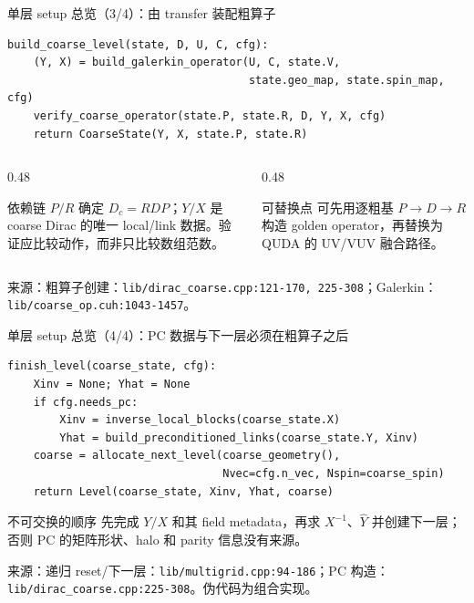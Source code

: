 \documentclass[UTF8,aspectratio=169,11pt]{ctexbeamer}
\newcommand{\source}[1]{\vspace{0.05em}\par{\raggedright\scriptsize\color{muted}来源：#1\par}}
\newcommand{\codepath}[1]{\nolinkurl{#1}}
\begin{document}
\begin{frame}[fragile,t]{单层 setup 总览（3/4）：由 transfer 装配粗算子}
  \small
  \begin{lstlisting}[firstnumber=1]
build_coarse_level(state, D, U, C, cfg):
    (Y, X) = build_galerkin_operator(U, C, state.V,
                                     state.geo_map, state.spin_map, cfg)
    verify_coarse_operator(state.P, state.R, D, Y, X, cfg)
    return CoarseState(Y, X, state.P, state.R)
  \end{lstlisting}
  \begin{columns}[T,totalwidth=\textwidth]
    \begin{column}{0.48\textwidth}
      \begin{block}{依赖链}
        \(P/R\) 确定 \(D_c=RDP\)；\(Y/X\) 是 coarse Dirac 的唯一 local/link 数据。验证应比较动作，而非只比较数组范数。
      \end{block}
    \end{column}
    \begin{column}{0.48\textwidth}
      \begin{alertblock}{可替换点}
        可先用逐粗基 \(P\to D\to R\) 构造 golden operator，再替换为 QUDA 的 UV/VUV 融合路径。
      \end{alertblock}
    \end{column}
  \end{columns}
  \source{粗算子创建：\codepath{lib/dirac_coarse.cpp:121-170, 225-308}；Galerkin：\codepath{lib/coarse_op.cuh:1043-1457}。}
\end{frame}

\begin{frame}[fragile,t]{单层 setup 总览（4/4）：PC 数据与下一层必须在粗算子之后}
  \small
  \begin{lstlisting}[firstnumber=1]
finish_level(coarse_state, cfg):
    Xinv = None; Yhat = None
    if cfg.needs_pc:
        Xinv = inverse_local_blocks(coarse_state.X)
        Yhat = build_preconditioned_links(coarse_state.Y, Xinv)
    coarse = allocate_next_level(coarse_geometry(),
                                 Nvec=cfg.n_vec, Nspin=coarse_spin)
    return Level(coarse_state, Xinv, Yhat, coarse)
  \end{lstlisting}
  \begin{alertblock}{不可交换的顺序}
    先完成 \(Y/X\) 和其 field metadata，再求 \(X^{-1}\)、\(\widehat Y\) 并创建下一层；否则 PC 的矩阵形状、halo 和 parity 信息没有来源。
  \end{alertblock}
  \source{递归 reset/下一层：\codepath{lib/multigrid.cpp:94-186}；PC 构造：\codepath{lib/dirac_coarse.cpp:225-308}。伪代码为组合实现。}
\end{frame}
\end{document}

